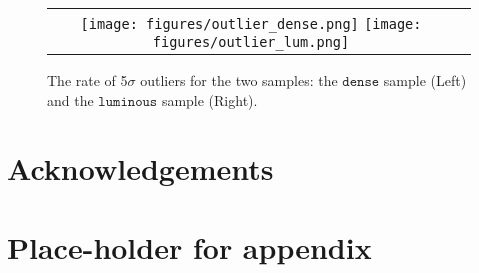 \documentclass[fleqn,usenatbib]{mnras}
\begin{document}
\begin{figure*}
 \begin{tabular}{cc}
\texttt{[image: figures/outlier\_dense.png]}
\texttt{[image: figures/outlier\_lum.png]}
\end{tabular}
\caption{\label{fig:outlier} The rate of 5$\sigma$ outliers for the two samples: the $\mathtt{dense}$ sample (Left) and the $\mathtt{luminous}$ sample (Right).}
\end{figure*}


\section*{Acknowledgements}









\appendix

\section{Place-holder for appendix}

\bsp	%
\label{lastpage}
\end{document}
